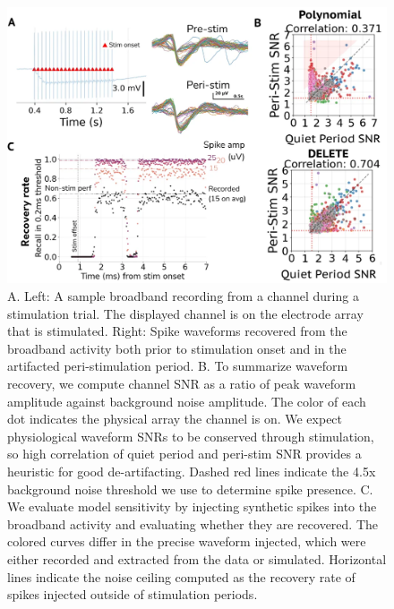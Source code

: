 \documentclass[12pt,oneside]{report}
\begin{document}
\begin{figure}[h]
  \centering
  \includegraphics[width=0.8\linewidth]{ch4_delete_peristim.png}
  \caption{A. Left: A sample broadband recording from a channel during a stimulation trial. The displayed channel is on the electrode array that is stimulated. Right: Spike waveforms recovered from the broadband activity both prior to stimulation onset and in the artifacted peri-stimulation period. B. To summarize waveform recovery, we compute channel SNR as a ratio of peak waveform amplitude against background noise amplitude. The color of each dot indicates the physical array the channel is on. We expect physiological waveform SNRs to be conserved through stimulation, so high correlation of quiet period and peri-stim SNR provides a heuristic for good de-artifacting. Dashed red lines indicate the 4.5x background noise threshold we use to determine spike presence. C. We evaluate model sensitivity by injecting synthetic spikes into the broadband activity and evaluating whether they are recovered. The colored curves differ in the precise waveform injected, which were either recorded and extracted from the data or simulated. Horizontal lines indicate the noise ceiling computed as the recovery rate of spikes injected outside of stimulation periods.}
  \label{fig:delete_peristim}
\end{figure}
\end{document}
